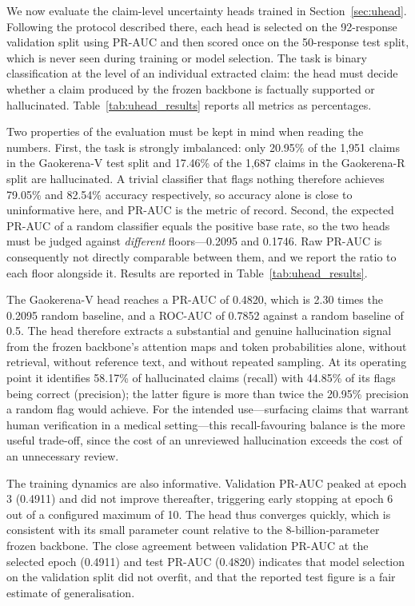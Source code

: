 \documentclass[review]{elsarticle}
\begin{document}
We now evaluate the claim-level uncertainty heads trained in Section~\ref{sec:uhead}. Following the protocol described there, each head is selected on the 92-response validation split using PR-AUC and then scored once on the 50-response test split, which is never seen during training or model selection. The task is binary classification at the level of an individual extracted claim: the head must decide whether a claim produced by the frozen backbone is factually supported or hallucinated. Table~\ref{tab:uhead_results} reports all metrics as percentages.

Two properties of the evaluation must be kept in mind when reading the numbers. First, the task is strongly imbalanced: only 20.95\% of the 1{,}951 claims in the Gaokerena-V test split and 17.46\% of the 1{,}687 claims in the Gaokerena-R split are hallucinated. A trivial classifier that flags nothing therefore achieves 79.05\% and 82.54\% accuracy respectively, so accuracy alone is close to uninformative here, and PR-AUC is the metric of record. Second, the expected PR-AUC of a random classifier equals the positive base rate, so the two heads must be judged against \emph{different} floors---0.2095 and 0.1746. Raw PR-AUC is consequently not directly comparable between them, and we report the ratio to each floor alongside it. Results are reported in Table~\ref{tab:uhead_results}.

The Gaokerena-V head reaches a PR-AUC of 0.4820, which is 2.30 times the 0.2095 random baseline, and a ROC-AUC of 0.7852 against a random baseline of 0.5. The head therefore extracts a substantial and genuine hallucination signal from the frozen backbone's attention maps and token probabilities alone, without retrieval, without reference text, and without repeated sampling. At its operating point it identifies 58.17\% of hallucinated claims (recall) with 44.85\% of its flags being correct (precision); the latter figure is more than twice the 20.95\% precision a random flag would achieve. For the intended use---surfacing claims that warrant human verification in a medical setting---this recall-favouring balance is the more useful trade-off, since the cost of an unreviewed hallucination exceeds the cost of an unnecessary review.

The training dynamics are also informative. Validation PR-AUC peaked at epoch 3 (0.4911) and did not improve thereafter, triggering early stopping at epoch 6 out of a configured maximum of 10. The head thus converges quickly, which is consistent with its small parameter count relative to the 8-billion-parameter frozen backbone. The close agreement between validation PR-AUC at the selected epoch (0.4911) and test PR-AUC (0.4820) indicates that model selection on the validation split did not overfit, and that the reported test figure is a fair estimate of generalisation.
\end{document}
